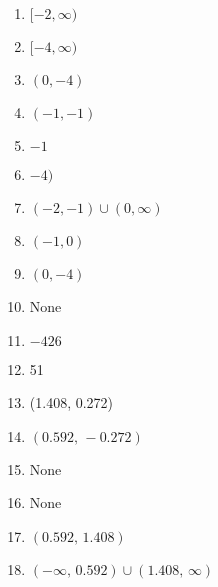 \begin{enumerate}
    \item $[-2, \infty)$
    \item $[-4, \infty)$
    \item $(0, -4)$
    \item $(-1,-1)$
    \item $-1$
    \item $-4)$
    \item $(-2, -1) \cup (0, \infty)$
    \item $(-1,0)$
    \item $(0,-4)$
    \item None
    \item $-426$
    \item 51
    \item (1.408, 0.272)
    \item $(0.592, \, -0.272)$
    \item None
    \item None
    \item $(0.592, \, 1.408)$
    \item $(-\infty, \, 0.592) \cup (1.408, \, \infty)$
\end{enumerate}